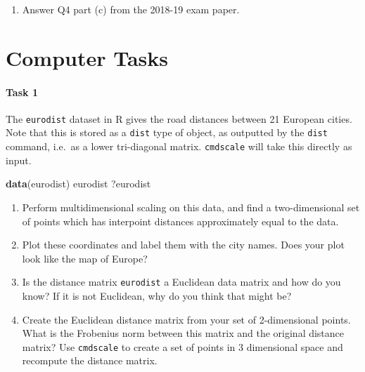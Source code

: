 \documentclass[]{book}
\newenvironment{Shaded}{\begin{snugshade}}{\end{snugshade}}
\newcommand{\KeywordTok}[1]{\textcolor[rgb]{0.13,0.29,0.53}{\textbf{#1}}}
\newcommand{\NormalTok}[1]{#1}
\providecommand{\tightlist}{%
  \setlength{\itemsep}{0pt}\setlength{\parskip}{0pt}}
\let\oldparagraph\paragraph
\renewcommand{\paragraph}[1]{\oldparagraph{#1}\mbox{}}
\theoremstyle{definition}
\theoremstyle{definition}
\theoremstyle{definition}
\theoremstyle{remark}
\begin{document}
\begin{enumerate}
\def\labelenumi{\arabic{enumi}.}
\setcounter{enumi}{3}
\tightlist
\item
  Answer Q4 part (c) from the 2018-19 exam paper.
\end{enumerate}

\hypertarget{computer-tasks-2}{%
\section{Computer Tasks}\label{computer-tasks-2}}

\hypertarget{task-1-1}{%
\paragraph{Task 1}\label{task-1-1}}

The \texttt{eurodist} dataset in R gives the road distances between 21 European cities. Note that this is stored as a \texttt{dist} type of object, as outputted by the \texttt{dist} command, i.e.~as a lower tri-diagonal matrix. \texttt{cmdscale} will take this directly as input.

\begin{Shaded}
\begin{Highlighting}[]
\KeywordTok{data}\NormalTok{(eurodist)}
\NormalTok{eurodist}
\NormalTok{?eurodist}
\end{Highlighting}
\end{Shaded}

\begin{enumerate}
\def\labelenumi{\roman{enumi}.}
\item
  Perform multidimensional scaling on this data, and find a two-dimensional set of points which has interpoint distances approximately equal to the data.
\item
  Plot these coordinates and label them with the city names. Does your plot look like the map of Europe?
\item
  Is the distance matrix \texttt{eurodist} a Euclidean data matrix and how do you know? If it is not Euclidean, why do you think that might be?
\item
  Create the Euclidean distance matrix from your set of 2-dimensional points. What is the Frobenius norm between this matrix and the original distance matrix? Use \texttt{cmdscale} to create a set of points in 3 dimensional space and recompute the distance matrix.
\end{enumerate}
\end{document}
